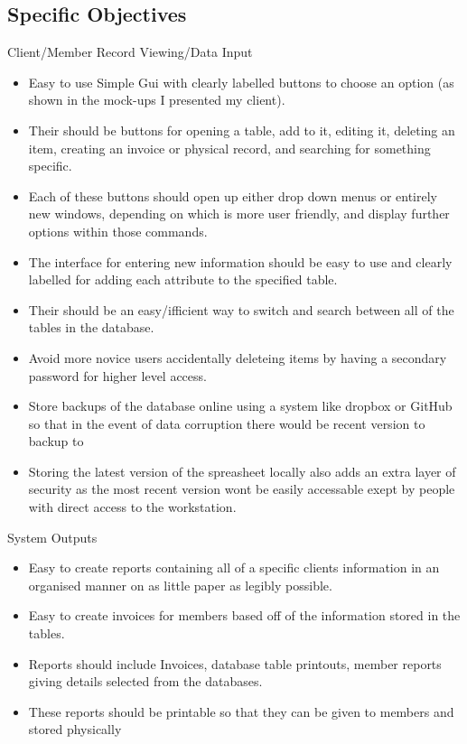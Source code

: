 \subsection{Specific Objectives}

Client/Member Record Viewing/Data Input

\begin{itemize}  

        \item Easy to use Simple Gui with clearly labelled buttons to choose an option (as shown in the mock-ups I presented my client).
        \item Their should be buttons for opening a table, add to it, editing it, deleting an item, creating an invoice or physical record, and searching for something specific.
        \item Each of these buttons should open up either drop down menus or entirely new windows, depending on which is more user friendly, and display further options within those commands.
        \item The interface for entering new information should be easy to use and clearly labelled for adding each attribute to the specified table.
        \item Their should be an easy/ifficient way to switch and search between all of the tables in the database.
        \item Avoid more novice users accidentally deleteing items by having a secondary password for higher level access.
        \item Store backups of the database online using a system like dropbox or GitHub so that in the event of data corruption there would be recent version to backup to
        \item Storing the latest version of the spreasheet locally also adds an extra layer of security as the most recent version wont be easily accessable exept by people with direct access to the workstation.
    \end{itemize}


System Outputs

\begin{itemize}  

        \item Easy to create reports containing all of a specific clients information in an organised manner on as little paper as legibly possible.
        \item Easy to create invoices for members based off of the information stored in the tables.
        \item Reports should include Invoices, database table printouts, member reports giving details selected from the databases.
        \item These reports should be printable so that they can be given to members and stored physically
        
\end{itemize}

